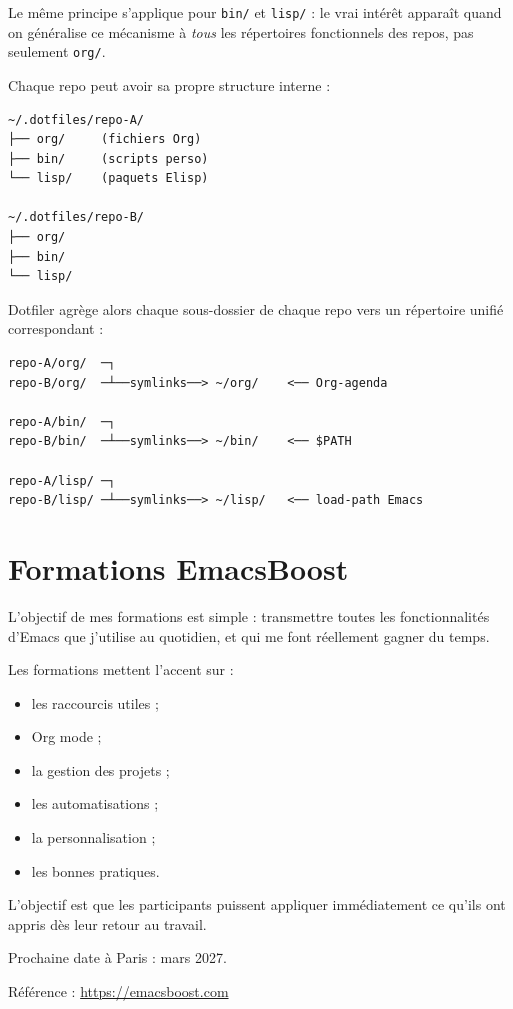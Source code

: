 \documentclass{mcreport}
\begin{document}
Le même principe s'applique pour \verb|bin/| et \verb|lisp/| : le vrai intérêt apparaît quand
on généralise ce mécanisme à \emph{tous} les répertoires \og fonctionnels\fg{} des repos, pas
seulement \verb|org/|.

Chaque repo peut avoir sa propre structure interne :

\begin{verbatim}
~/.dotfiles/repo-A/
├── org/     (fichiers Org)
├── bin/     (scripts perso)
└── lisp/    (paquets Elisp)

~/.dotfiles/repo-B/
├── org/
├── bin/
└── lisp/
\end{verbatim}

Dotfiler agrège alors chaque sous-dossier de chaque repo vers un répertoire
unifié correspondant :

\begin{verbatim}
repo-A/org/  ─┐
repo-B/org/  ─┴──symlinks──> ~/org/    <── Org-agenda

repo-A/bin/  ─┐
repo-B/bin/  ─┴──symlinks──> ~/bin/    <── $PATH

repo-A/lisp/ ─┐
repo-B/lisp/ ─┴──symlinks──> ~/lisp/   <── load-path Emacs
\end{verbatim}
\chapter{Formations EmacsBoost}
\label{sec:orgb8405ee}

L'objectif de mes formations est simple : transmettre toutes les fonctionnalités
d'Emacs que j'utilise au quotidien, et qui me font réellement gagner du temps.

Les formations mettent l'accent sur :

\begin{itemize}
\item les raccourcis utiles ;
\item Org mode ;
\item la gestion des projets ;
\item les automatisations ;
\item la personnalisation ;
\item les bonnes pratiques.
\end{itemize}

L'objectif est que les participants puissent appliquer immédiatement ce qu'ils
ont appris dès leur retour au travail.

Prochaine date à Paris : mars 2027.

Référence : \url{https://emacsboost.com}
\end{document}
